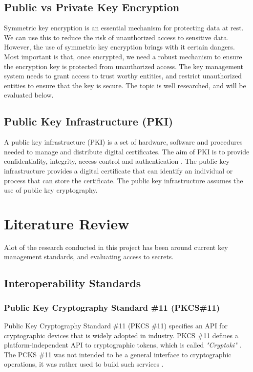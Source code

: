 \documentclass[11pt, a4paper, twoside, notitlepage]{article}
\begin{document}
\subsection*{Public vs Private Key Encryption}
Symmetric key encryption is an essential mechanism for protecting data at rest. We can use this to reduce the risk of unauthorized access to sensitive data. However, the use of symmetric key encryption brings with it certain dangers. Most important is that, once encrypted, we need a robust mechanism to ensure the encryption key is protected from unauthorized access. The key management system needs to grant access to trust worthy entities, and restrict unauthorized entities to ensure that the key is secure. The topic is well researched, and will be evaluated below. 


\subsection*{Public Key Infrastructure (PKI)}
A public key infrastructure (PKI) is a set of hardware, software and procedures needed to manage and distribute digital certificates. The aim of PKI is to provide confidentiality, integrity, access control and authentication \cite{PKI:Online}.    The public key infrastructure provides a digital certificate that can identify an individual or process that can store the certificate. The public key infrastructure assumes the use of public key cryptography. 

\section{Literature Review}
Alot of the research conducted in this project has been around current key management standards, and evaluating access to secrets. \\

\subsection*{Interoperability Standards}
\subsubsection*{Public Key Cryptography Standard \#11 (PKCS\#11)}
Public Key Cryptography Standard \#11  (PKCS \#11) specifies an API for cryptographic devices that is widely adopted in industry. PKCS \#11 defines a platform-independent API to cryptographic tokens, which is called \emph{"Cryptoki"} \cite{bortolozzo2010attacking}. The PCKS \#11 was not intended to be a general interface to cryptographic operations, it was rather used to build such services \cite{p}.
\end{document}
